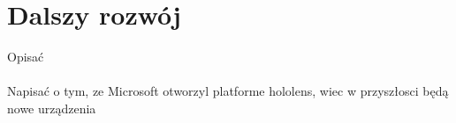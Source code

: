 \newpage
\section{Dalszy rozwój}
{\color{red}Opisać}

\paragraph{}
{\color{red}Napisać o tym, ze Microsoft otworzyl platforme hololens, wiec w przyszłosci będą nowe urządzenia}
